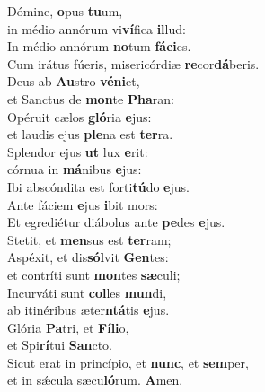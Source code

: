 \evenverse Dómine, \textbf{o}pus \textbf{tu}um,~\*\\
\evenverse in médio annórum vi\textbf{ví}fica \textbf{il}lud:\\
\oddverse In médio annórum \textbf{no}tum \textbf{fá}\textbf{ci}es.~\*\\
\oddverse Cum irátus fúeris, misericórdiæ \textbf{re}cor\textbf{dá}beris.\\
\evenverse Deus ab \textbf{Au}stro \textbf{vé}\textbf{ni}et,~\*\\
\evenverse et Sanctus de \textbf{mon}te \textbf{Pha}ran:\\
\oddverse Opéruit cælos \textbf{gló}ria \textbf{e}jus:~\*\\
\oddverse et laudis ejus \textbf{ple}na est \textbf{ter}ra.\\
\evenverse Splendor ejus \textbf{ut} lux \textbf{e}rit:~\*\\
\evenverse córnua in \textbf{má}nibus \textbf{e}jus:\\
\oddverse Ibi abscóndita est forti\textbf{tú}do \textbf{e}jus.~\*\\
\oddverse Ante fáciem \textbf{e}jus \textbf{i}bit mors:\\
\evenverse Et egrediétur diábolus ante \textbf{pe}des \textbf{e}jus.~\*\\
\evenverse Stetit, et \textbf{men}sus est \textbf{ter}ram;\\
\oddverse Aspéxit, et dis\textbf{sól}vit \textbf{Gen}tes:~\*\\
\oddverse et contríti sunt \textbf{mon}tes \textbf{sæ}culi;\\
\evenverse Incurváti sunt \textbf{col}les \textbf{mun}di,~\*\\
\evenverse ab itinéribus æter\textbf{ntá}tis \textbf{e}jus.\\
\oddverse Glória \textbf{Pa}tri, et \textbf{Fí}\textbf{li}o,~\*\\
\oddverse et Spi\textbf{rí}tui \textbf{San}cto.\\
\evenverse Sicut erat in princípio, et \textbf{nunc}, et \textbf{sem}per,~\*\\
\evenverse et in sǽcula sæcu\textbf{ló}rum. \textbf{A}men.\\
